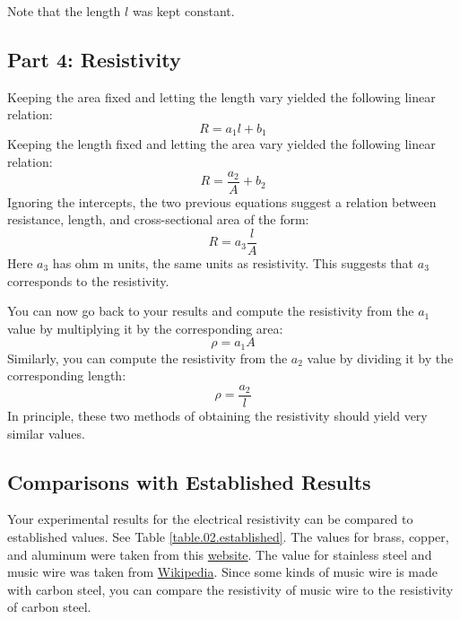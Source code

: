Note that the length $l$ was kept constant.
%
\subsection{Part 4: Resistivity}
%
Keeping the area fixed and letting the length vary yielded the following linear relation:
\begin{equation}
	R = a_{1} l + b_{1}
\end{equation}
Keeping the length fixed and letting the area vary yielded the following linear relation:
\begin{equation}
	R = \frac{a_{2}}{A} + b_{2}
\end{equation}
Ignoring the intercepts, the two previous equations suggest a relation between resistance, length, and cross-sectional area of the form:
\begin{equation}
	R = a_{3} \frac{l}{A}
\end{equation}
Here $a_{3}$ has ohm{ }\textperiodcentered{ }m units, the same units as resistivity. This suggests that $a_{3}$ corresponds to the resistivity.

You can now go back to your results and compute the resistivity from the $a_{1}$ value by multiplying it by the corresponding area:
\begin{equation}
	\rho = a_{1} A
\end{equation}
Similarly, you can compute the resistivity from the $a_{2}$ value by dividing it by the corresponding length:
\begin{equation}
	\rho = \frac{a_{2}}{l}
\end{equation}
In principle, these two methods of obtaining the resistivity should yield very similar values.
%
\subsection{Comparisons with Established Results}
%
Your experimental results for the electrical resistivity can be compared to established values. See Table \ref{table.02.established}. The values for brass, copper, and aluminum were taken from this \href{http://www.radio-electronics.com/info/formulae/resistance/resistivity-table.php}{website}. The value for stainless steel and music wire was taken from \href{https://en.wikipedia.org/wiki/Electrical_resistivity_and_conductivity}{Wikipedia}. Since some kinds of music wire is made with carbon steel, you can compare the resistivity of music wire to the resistivity of carbon steel.
%
